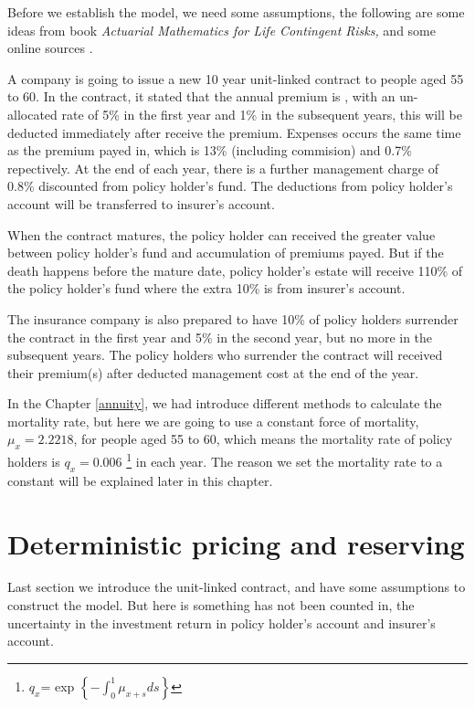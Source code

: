 \documentclass{report}
\begin{document}
Before we establish the model, we need some assumptions, the following are some ideas from  \cite{bib:unitlinkeg} book {\em Actuarial Mathematics for Life Contingent Risks,} and some online sources \cite{bib:unitlinkedonline}. 


A company is going to issue a new 10 year unit-linked contract to people aged 55 to 60. In the contract, it stated that the annual premium is , with an un-allocated rate of 5\% in the first year and 1\% in the subsequent years, this will be deducted immediately after receive the premium. Expenses occurs the same time as the premium payed in, which is 13\% (including commision) and 0.7\% repectively. At the end of each year, there is a further management charge of 0.8\%  discounted from policy holder's fund. The deductions from policy holder's account will be transferred to insurer's account.

When the contract matures, the policy holder can received the greater value between policy holder's fund and accumulation of premiums payed. But if the death happens before the mature date, policy holder's estate will receive 110\% of the policy holder's fund where the extra 10\% is from insurer's account.

The insurance company is also prepared to have 10\% of policy holders surrender the contract in the first year and 5\% in the second year, but no more in the subsequent years. The policy holders who surrender the contract will received their premium(s) after deducted management cost at the end of the year.

In the Chapter \ref{annuity}, we had introduce different methods to calculate the mortality rate, but here we are going to use a constant force of mortality, $\mu_x=2.2218$, for people aged 55 to 60, which means the mortality rate of policy holders is $q_x=0.006$ \footnote{$q_x$= exp $\left\{-\int_0^1 \mu_{x+s}ds\right\}$} in each year. The reason we set the mortality rate to a constant will be explained later in this chapter.  





\section{Deterministic pricing and reserving}

Last section we introduce the unit-linked contract, and have some assumptions to construct the model. But here is something has not been counted in, the uncertainty in the investment return in policy holder's account and insurer's account. 
\end{document}
